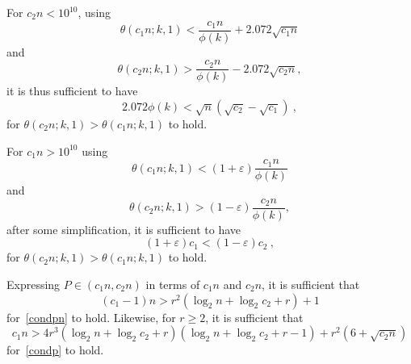 For $c_2n < 10^{10}$, using \[\theta(c_1n;k,1) <
\frac{c_1n}{\phi(k)}+2.072\sqrt{c_1n}
\]
and \[\theta(c_2n;k,1) > \frac{c_2n}{\phi(k)}-2.072\sqrt{c_2n},
\]it is thus sufficient to have
\begin{equation}\label{cond1}
2.072\phi(k) < \sqrt{n}(\sqrt{c_2}-\sqrt{c_1})~,
\end{equation}
for $\theta(c_2n;k,1)> \theta(c_1n;k,1)$ to hold.


For $c_1n>10^{10}$ using \[\theta(c_1n;k,1) < (1+\varepsilon)
\frac{c_1n}{\phi(k)}
\]
and \[\theta(c_2n;k,1) > (1-\varepsilon)\frac{c_2n}{\phi(k)},
\] after some simplification, it is sufficient to have
\begin{equation}\label{cond1a}
(1+\varepsilon)c_1 < (1-\varepsilon)c_2~,
\end{equation}
for $\theta(c_2n;k,1)> \theta(c_1n;k,1)$ to hold.

 Expressing $P \in (c_1n,c_2n)$ in terms of $c_1n$ and $c_2n$, it is
sufficient that
\begin{equation}\label{cond2}
(c_1-1)n > r^2(\log_2n+\log_2c_2+r)+1
\end{equation}
for~\eqref{condpn} to hold. Likewise, for $r \geq 2$, it is
sufficient that
\begin{equation}\label{cond3}
c_1n>4r^3(\log_2n+\log_2c_2+r)(\log_2n+\log_2c_2+r-1)+r^2(6+\sqrt{c_2n})
\end{equation}
for~\eqref{condp} to hold.




